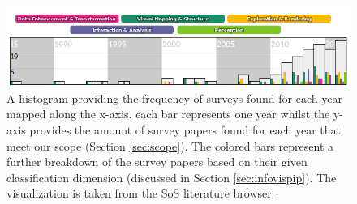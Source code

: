 \begin{figure}
\begin{center}
\includegraphics[width=1\textwidth]{images/yearbreakdownv2}
\caption{A histogram providing the frequency of surveys found for each year mapped along the x-axis. each bar represents one year whilst the y-axis provides the amount of survey papers found for each year that meet our scope (Section \ref{sec:scope}). The colored bars represent a further breakdown of the survey papers based on their given classification dimension (discussed in Section \ref{sec:infovispip}). The visualization is taken from the SoS literature browser \cite{surVis}.} \label{fig: yearbreakdown}
\end{center}
\end{figure}

